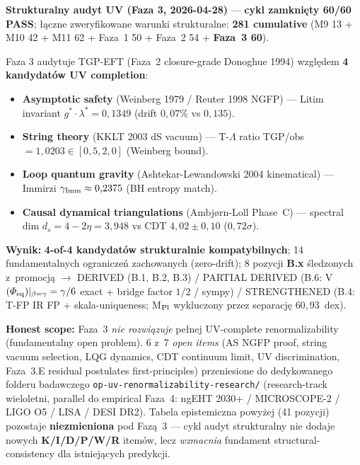 
\medskip\noindent
\textbf{Strukturalny audyt UV (Faza 3, 2026-04-28)} ---
\textbf{cykl zamkni\k{e}ty 60/60 PASS}; ł\k{a}czne zweryfikowane warunki strukturalne:
\textbf{281 cumulative} (M9 13 + M10 42 + M11 62 + Faza~1 50 + Faza~2 54 +
\textbf{Faza~3 60}).

\smallskip
Faza 3 audytuje TGP-EFT (Faza~2 closure-grade Donoghue 1994) wzgl\k{e}dem
\textbf{4 kandydat\'ow UV completion}:
\begin{itemize}\itemsep0pt
  \item \textbf{Asymptotic safety} (Weinberg 1979 / Reuter 1998 NGFP) ---
        Litim invariant $g^* \cdot \lambda^* = 0{,}1349$ (drift $0{,}07\%$ vs $0{,}135$).
  \item \textbf{String theory} (KKLT 2003 dS vacuum) ---
        T-$\Lambda$ ratio TGP/obs $= 1{,}0203 \in [0{,}5, 2{,}0]$ (Weinberg bound).
  \item \textbf{Loop quantum gravity} (Ashtekar-Lewandowski 2004 kinematical) ---
        Immirzi $\gamma_{\rm Imm} \approx 0{,}2375$ (BH entropy match).
  \item \textbf{Causal dynamical triangulations} (Ambj\o rn-Loll Phase~C) ---
        spectral dim $d_s = 4 - 2\eta = 3{,}948$ vs CDT $4{,}02 \pm 0{,}10$ ($0{,}72\sigma$).
\end{itemize}

\noindent
\textbf{Wynik:} \textbf{4-of-4 kandydat\'ow strukturalnie kompatybilnych};
14 fundamentalnych ogranicze\'n zachowanych (zero-drift); 8 pozycji
\textbf{B.x} \'sledzonych z~promocj\k{a} $\to$ DERIVED (B.1, B.2, B.3) /
PARTIAL DERIVED (B.6: V$(\Phi_{\rm eq})|_{\beta=\gamma} = \gamma/6$ exact +
bridge factor $1/2$ / sympy) / STRENGTHENED (B.4: T-FP IR FP +
ska\-la-uniqueness; M$_{\rm Pl}$ wykluczony przez separacj\k{e} $60{,}93$~dex).

\smallskip\noindent
\textbf{Honest scope:} Faza~3 \emph{nie rozwi\k{a}zuje} pe\l{}nej UV-complete
renormalizability (fundamentalny open problem). 6 z~7 \emph{open items}
(AS NGFP proof, string vacuum selection, LQG dynamics, CDT continuum limit,
UV discrimination, Faza~3.E residual postulates first-principles)
przeniesione do dedykowanego folderu badawczego
\texttt{op-uv-renormalizability-research/} (research-track wieloletni,
parallel do empirical Faza~4: ngEHT 2030+ / MICROSCOPE-2 / LIGO O5 /
LISA / DESI DR2). Tabela epistemiczna powy\.zej (41 pozycji) pozostaje
\textbf{niezmieniona} pod Faz\k{a}~3 --- cykl audyt strukturalny nie
dodaje nowych \textbf{K/I/D/P/W/R} item\'ow, lecz \emph{wzmacnia}
fundament structural-consistency dla istniej\k{a}cych predykcji.
